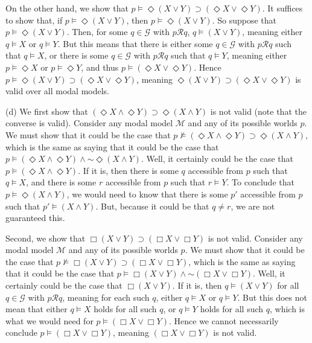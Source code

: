\documentclass{article}
\newcommand*{\oldneg}{\mathord{\sim}}
\theoremstyle{definition}
\begin{document}
On the other hand, we show that $p\vDash\Diamond (X\vee Y)\supset (\Diamond X\vee\Diamond Y)$. It suffices to show that, 
if $p\vDash \Diamond (X\vee Y)$, then $p\vDash\Diamond (X\vee Y)$. So suppose that 
$p\vDash\Diamond (X\vee Y)$. Then, for some $q\in\mathcal{G}$ with $p\mathcal{R}q$, 
$q\vDash (X\vee Y)$, meaning either $q\vDash X$ or $q\vDash Y$. But this means that there is either some 
$q\in\mathcal{G}$ with $p\mathcal{R}q$ such that $q\vDash X$, or there is some 
$q\in\mathcal{G}$ with $p\mathcal{R}q$ such that $q\vDash Y$, meaning 
either $p\vDash\Diamond X$ or $p\vDash\Diamond Y$, and thus $p\vDash (\Diamond X\vee\Diamond Y)$. Hence 
$p\vDash\Diamond (X\vee Y)\supset (\Diamond X\vee\Diamond Y)$, meaning 
$\Diamond (X\vee Y)\supset (\Diamond X\vee\Diamond Y)$ is valid over all modal models. 

(d) We first show that $(\Diamond X\wedge\Diamond Y)\supset\Diamond (X\wedge Y)$ is not valid (note that the converse is valid). 
Consider any modal model $\mathcal{M}$ and any of its possible worlds $p$. We must show that it could be the case 
that $p\nvDash (\Diamond X\wedge\Diamond Y)\supset\Diamond (X\wedge Y)$, which is the same as saying that it could be the 
case that $p\vDash (\Diamond X\wedge\Diamond Y)\wedge\oldneg\Diamond (X\wedge Y)$. Well, it certainly could be the case 
that $p\vDash (\Diamond X\wedge\Diamond Y)$. If it is, then there is some $q$ accessible from $p$ 
such that $q\vDash X$, and there is some $r$ accessible from $p$ such that $r\vDash Y$. To conclude that 
$p\vDash\Diamond (X\wedge Y)$, we would need to know that there is some $p'$ accessible from $p$ such that 
$p'\vDash (X\wedge Y)$. But, because it could be that $q\ne r$, we are not guaranteed this. 

Second, we show that $\Box (X\vee Y)\supset (\Box X\vee\Box Y)$ is not valid. Consider any modal model 
$\mathcal{M}$ and any of its possible worlds $p$. We must show that it could be the case that 
$p\nvDash \Box (X\vee Y)\supset (\Box X\vee\Box Y)$, which is the same as saying that it could be the case that 
$p\vDash \Box (X\vee Y)\wedge\oldneg (\Box X\vee\Box Y)$. Well, it certainly could be the case that 
$\Box (X\vee Y)$. If it is, then $q\vDash (X\vee Y)$ for all $q\in\mathcal{G}$ with $p\mathcal{R}q$, meaning for each such $q$, 
either $q\vDash X$ or $q\vDash Y$. But this does not mean that either $q\vDash X$ holds for all such $q$, or 
$q\vDash Y$ holds for all such $q$, which is what we would need for $p\vDash (\Box X\vee\Box Y)$. Hence we cannot necessarily 
conclude $p\vDash (\Box X\vee\Box Y)$, meaning $(\Box X\vee\Box Y)$ is not valid. 
\end{document}
